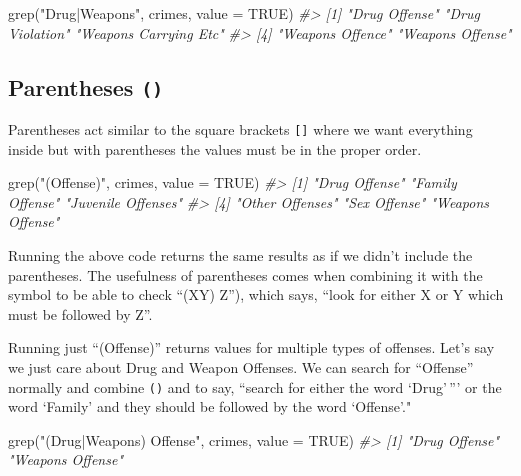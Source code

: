 \documentclass[
]{krantz}
\makeatletter
\newenvironment{Shaded}{\begin{snugshade}}{\end{snugshade}}
\newcommand{\AttributeTok}[1]{\textcolor[rgb]{0.61,0.61,0.61}{#1}}
\newcommand{\CommentTok}[1]{\textcolor[rgb]{0.37,0.37,0.37}{\textit{#1}}}
\newcommand{\ConstantTok}[1]{\textcolor[rgb]{0,0,0}{#1}}
\newcommand{\FunctionTok}[1]{\textcolor[rgb]{0,0,0}{#1}}
\newcommand{\NormalTok}[1]{#1}
\newcommand{\StringTok}[1]{\textcolor[rgb]{0.5,0.5,0.5}{#1}}
\newenvironment{kframe}{%
\medskip{}
\setlength{\fboxsep}{.8em}
 \def\at@end@of@kframe{}%
 \ifinner\ifhmode%
  \def\at@end@of@kframe{\end{minipage}}%
  \begin{minipage}{\columnwidth}%
 \fi\fi%
 \def\FrameCommand##1{\hskip\@totalleftmargin \hskip-\fboxsep
 \colorbox{shadecolor}{##1}\hskip-\fboxsep
     \hskip-\linewidth \hskip-\@totalleftmargin \hskip\columnwidth}%
 \MakeFramed {\advance\hsize-\width
   \@totalleftmargin\z@ \linewidth\hsize
   \@setminipage}}%
 {\par\unskip\endMakeFramed%
 \at@end@of@kframe}
\renewenvironment{Shaded}{\begin{kframe}}{\end{kframe}}
\makeatother
\begin{document}
\begin{Shaded}
\begin{Highlighting}[]
\FunctionTok{grep}\NormalTok{(}\StringTok{"Drug|Weapons"}\NormalTok{, crimes, }\AttributeTok{value =} \ConstantTok{TRUE}\NormalTok{)}
\CommentTok{\#\textgreater{} [1] "Drug Offense"         "Drug Violation"       "Weapons Carrying Etc"}
\CommentTok{\#\textgreater{} [4] "Weapons Offence"      "Weapons Offense"}
\end{Highlighting}
\end{Shaded}

\hypertarget{parentheses}{%
\subsection{\texorpdfstring{Parentheses \texttt{()}}{Parentheses ()}}\label{parentheses}}

Parentheses act similar to the square brackets \texttt{{[}{]}} where we want everything inside but with parentheses the values must be in the proper order.

\begin{Shaded}
\begin{Highlighting}[]
\FunctionTok{grep}\NormalTok{(}\StringTok{"(Offense)"}\NormalTok{, crimes, }\AttributeTok{value =} \ConstantTok{TRUE}\NormalTok{)}
\CommentTok{\#\textgreater{} [1] "Drug Offense"      "Family Offense"    "Juvenile Offenses"}
\CommentTok{\#\textgreater{} [4] "Other Offenses"    "Sex Offense"       "Weapons Offense"}
\end{Highlighting}
\end{Shaded}

Running the above code returns the same results as if we didn't include the parentheses. The usefulness of parentheses comes when combining it with the \texttt{\textbar{}} symbol to be able to check ``(X\textbar Y) Z''), which says, ``look for either X or Y which must be followed by Z''.

Running just ``(Offense)'' returns values for multiple types of offenses. Let's say we just care about Drug and Weapon Offenses. We can search for ``Offense'' normally and combine \texttt{()} and \texttt{\textbar{}} to say, ``search for either the word `Drug'\,''' or the word `Family' and they should be followed by the word `Offense'."

\begin{Shaded}
\begin{Highlighting}[]
\FunctionTok{grep}\NormalTok{(}\StringTok{"(Drug|Weapons) Offense"}\NormalTok{, crimes, }\AttributeTok{value =} \ConstantTok{TRUE}\NormalTok{)}
\CommentTok{\#\textgreater{} [1] "Drug Offense"    "Weapons Offense"}
\end{Highlighting}
\end{Shaded}
\end{document}
